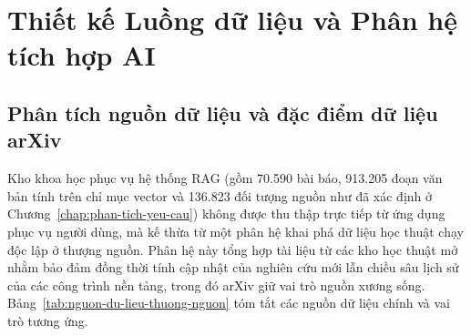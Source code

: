 
\chapter{Thiết kế Luồng dữ liệu và Phân hệ tích hợp AI}
\label{chap:data-pipeline-ai}

\section{Phân tích nguồn dữ liệu và đặc điểm dữ liệu arXiv}
\label{sec:nguon-du-lieu-arxiv}

Kho khoa học phục vụ hệ thống RAG (gồm 70.590 bài báo, 913.205 đoạn văn bản tính trên chỉ mục vector và 136.823 đối tượng nguồn như đã xác định ở Chương~\ref{chap:phan-tich-yeu-cau}) không được thu thập trực tiếp từ ứng dụng phục vụ người dùng, mà kế thừa từ một phân hệ khai phá dữ liệu học thuật chạy độc lập ở thượng nguồn. Phân hệ này tổng hợp tài liệu từ các kho học thuật mở nhằm bảo đảm đồng thời tính cập nhật của nghiên cứu mới lẫn chiều sâu lịch sử của các công trình nền tảng, trong đó arXiv giữ vai trò nguồn xương sống. Bảng~\ref{tab:nguon-du-lieu-thuong-nguon} tóm tắt các nguồn dữ liệu chính và vai trò tương ứng.

